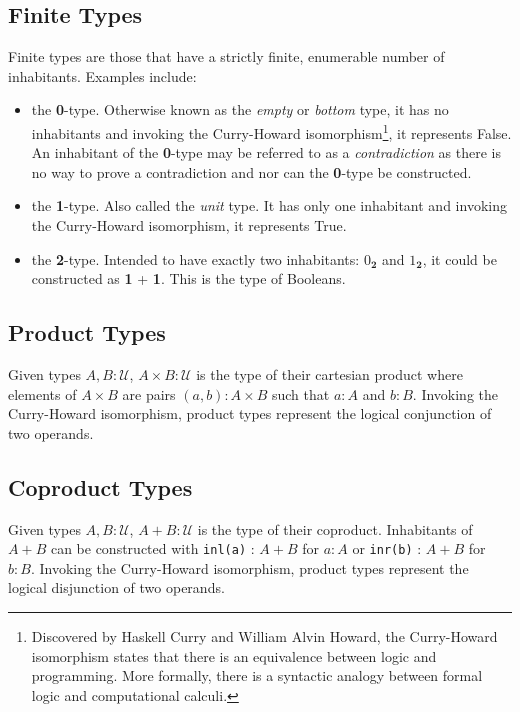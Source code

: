 \documentclass[12pt]{report}
\begin{document}
\subsection*{Finite Types}
Finite types are those that have a strictly finite, enumerable number of inhabitants. Examples include:
\begin{itemize}
\item the \textbf{0}-type. Otherwise known as the \textit{empty} or \textit{bottom} type, it has no inhabitants and invoking the Curry-Howard isomorphism\footnote{

Discovered by Haskell Curry and William Alvin Howard, the Curry-Howard isomorphism states that there is an equivalence between logic and programming. More formally, there is a syntactic analogy between formal logic and computational calculi.

}, it represents False. An inhabitant of the \textbf{0}-type may be referred to as a \textit{contradiction} as there is no way to prove a contradiction and nor can the \textbf{0}-type be constructed.
\item the \textbf{1}-type. Also called the \textit{unit} type. It has only one inhabitant and invoking the Curry-Howard isomorphism, it represents True. 
\item the \textbf{2}-type. Intended to have exactly two inhabitants: $0_\textbf{2}$ and $1_\textbf{2}$, it could be constructed as \textbf{1} + \textbf{1}. This is the type of Booleans.
\end{itemize}

\subsection*{Product Types}
Given types $A,B : \mathcal{U}$, $A \times B : \mathcal{U}$ is the type of their cartesian product where elements of $A \times B$ are pairs $(a,b) : A \times B$ such that $a : A$ and $b : B$. Invoking the Curry-Howard isomorphism, product types represent the logical conjunction of two operands.

\subsection*{Coproduct Types}
Given types $A,B : \mathcal{U}$, $A + B : \mathcal{U}$ is the type of their coproduct. Inhabitants of $A + B$ can be constructed with \texttt{inl(a)} : $A + B$ for $a : A$ or \texttt{inr(b)} : $A + B$ for $b : B$. Invoking the Curry-Howard isomorphism, product types represent the logical disjunction of two operands.
\end{document}

